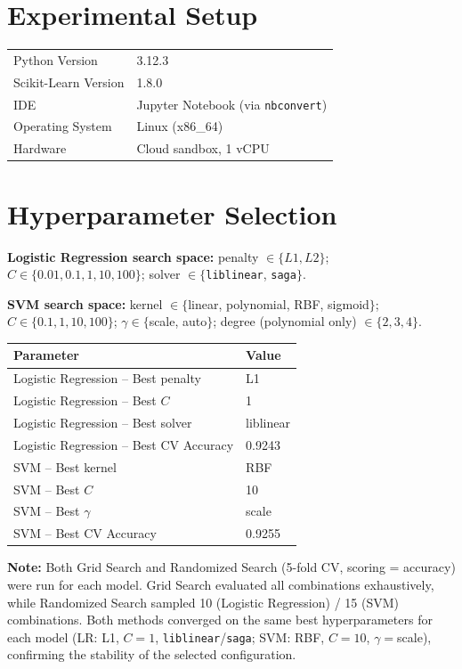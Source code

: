 \documentclass[12pt,a4paper]{article}
\begin{document}
\section{Experimental Setup}
\begin{tabular}{ll}
\toprule
Python Version & 3.12.3 \\
Scikit-Learn Version & 1.8.0 \\
IDE & Jupyter Notebook (via \texttt{nbconvert}) \\
Operating System & Linux (x86\_64) \\
Hardware & Cloud sandbox, 1 vCPU \\
\bottomrule
\end{tabular}

\section{Hyperparameter Selection}

\textbf{Logistic Regression search space:} penalty $\in \{L1, L2\}$; $C \in \{0.01, 0.1, 1, 10, 100\}$; solver $\in \{$\texttt{liblinear}, \texttt{saga}$\}$.

\textbf{SVM search space:} kernel $\in \{$linear, polynomial, RBF, sigmoid$\}$; $C \in \{0.1, 1, 10, 100\}$; $\gamma \in \{$scale, auto$\}$; degree (polynomial only) $\in \{2,3,4\}$.

\begin{tabular}{ll}
\toprule
Parameter & Value\\
\midrule
Logistic Regression -- Best penalty & L1 \\
Logistic Regression -- Best $C$ & 1 \\
Logistic Regression -- Best solver & liblinear \\
Logistic Regression -- Best CV Accuracy & 0.9243 \\
SVM -- Best kernel & RBF \\
SVM -- Best $C$ & 10 \\
SVM -- Best $\gamma$ & scale \\
SVM -- Best CV Accuracy & 0.9255 \\
\bottomrule
\end{tabular}

\textbf{Note:} Both Grid Search and Randomized Search (5-fold CV, scoring = accuracy) were run for each model. Grid Search evaluated all combinations exhaustively, while Randomized Search sampled 10 (Logistic Regression) / 15 (SVM) combinations. Both methods converged on the same best hyperparameters for each model (LR: L1, $C{=}1$, \texttt{liblinear}/\texttt{saga}; SVM: RBF, $C{=}10$, $\gamma{=}$scale), confirming the stability of the selected configuration.
\end{document}
